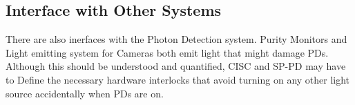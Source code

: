 



\subsection{Interface with Other Systems}
\label{sec:fdsp-slow-cryo-slow-other}


There are also inerfaces with the Photon Detection system.
Purity Monitors and Light emitting system for Cameras both emit light that might damage PDs.
Although this should be understood and quantified, CISC and SP-PD may have to Define the necessary hardware interlocks
that avoid turning on any other light source accidentally when PDs are on.

